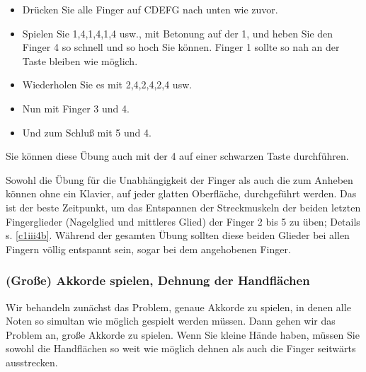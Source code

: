 \begin{itemize} 
 \item Drücken Sie alle Finger auf CDEFG nach unten wie zuvor.
 \item Spielen Sie 1,4,1,4,1,4 usw., mit Betonung auf der 1, und heben Sie den Finger 4 so schnell und so hoch Sie können.
 Finger 1 sollte so nah an der Taste bleiben wie möglich.
 \item Wiederholen Sie es mit 2,4,2,4,2,4 usw.
 \item Nun mit Finger 3 und 4.
 \item Und zum Schluß mit 5 und 4.
 \end{itemize}
Sie können diese Übung auch mit der 4 auf einer schwarzen Taste durchführen.

Sowohl die Übung für die Unabhängigkeit der Finger als auch die zum Anheben können ohne ein Klavier, auf jeder glatten Oberfläche, durchgeführt werden.
Das ist der beste Zeitpunkt, um das Entspannen der Streckmuskeln der beiden letzten Fingerglieder (Nagelglied und mittleres Glied) der Finger 2 bis 5 zu üben; Details s. \hyperref[c1iii4b]{\autoref{c1iii4b}}.
Während der gesamten Übung sollten diese beiden Glieder bei allen Fingern völlig entspannt sein, sogar bei dem angehobenen Finger.
 

\subsubsection{(Große) Akkorde spielen, Dehnung der Handflächen}
\label{c1iii7e}

Wir behandeln zunächst das Problem, genaue Akkorde zu spielen, in denen alle Noten so simultan wie möglich gespielt werden müssen.
Dann gehen wir das Problem an, große Akkorde zu spielen.
Wenn Sie kleine Hände haben, müssen Sie sowohl die Handflächen so weit wie möglich dehnen als auch die Finger seitwärts ausstrecken.


